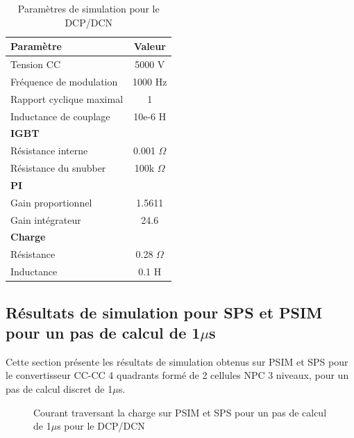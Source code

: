 \begin{table}[htb]
\centering
\begin{tabular}{|l|c|} 
  \hline
  \textbf{Paramètre} & \textbf{Valeur}  \\
  \hline\hline
  Tension CC & 5000 V\\ \hline
  Fréquence de modulation & 1000 Hz\\ \hline
  Rapport cyclique maximal & 1 \\ \hline
  Inductance de couplage & 10e-6 H \\ \hline \hline
  \multicolumn{2}{|l|}{\textbf{IGBT}}\\ \hline
  Résistance interne & 0.001 $\Omega$\\
  Résistance du snubber  & 100k $\Omega$\\ \hline \hline
   \multicolumn{2}{|l|}{\textbf{PI}}\\ \hline
  Gain proportionnel & 1.5611 \\
  Gain intégrateur & 24.6 \\ \hline \hline
  \multicolumn{2}{|l|}{\textbf{Charge}}\\ \hline
  Résistance & 0.28 $\Omega$\\
  Inductance & 0.1 H \\
  \hline
\end{tabular}
\caption{Paramètres de simulation pour le DCP/DCN}
\label{p_DCP}
\end{table}
\clearpage


\subsection{Résultats de simulation pour SPS et PSIM pour un pas de calcul de 1$\mu$s}
Cette section présente les résultats de simulation obtenus sur PSIM et SPS pour le convertisseur CC-CC 4 quadrants formé de 2 cellules NPC 3 niveaux, pour un pas de calcul discret de 1$\mu$s.



\begin{figure}[htb]
\caption{Courant traversant la charge sur PSIM et SPS pour un pas de calcul de 1$\mu$s pour le DCP/DCN}
\label{DC_ch_cou_1}
\end{figure}



